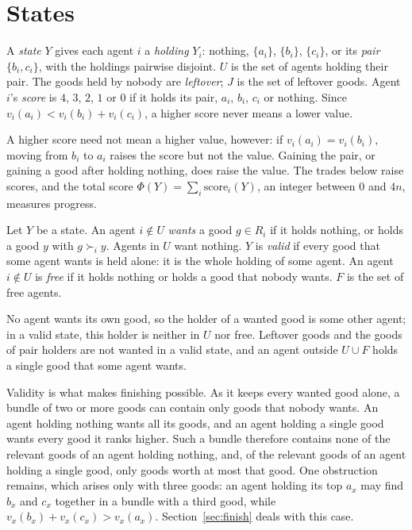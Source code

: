 \documentclass[runningheads,11pt]{llncs}
\begin{document}
\section{States}\label{sec:states}

\begin{definition}\label{def:state}
A \emph{state} $Y$ gives each agent $i$ a \emph{holding} $Y_i$: nothing, $\{a_i\}$, $\{b_i\}$, $\{c_i\}$, or its \emph{pair} $\{b_i,c_i\}$, with the holdings pairwise disjoint. $U$ is the set of agents holding their pair. The goods held by nobody are \emph{leftover}; $J$ is the set of leftover goods. Agent $i$'s \emph{score} is $4$, $3$, $2$, $1$ or $0$ if it holds its pair, $a_i$, $b_i$, $c_i$ or nothing. Since $v_i(a_i)<v_i(b_i)+v_i(c_i)$, a higher score never means a lower value.
\end{definition}

\noindent A higher score need not mean a higher value, however: if $v_i(a_i)=v_i(b_i)$, moving from $b_i$ to $a_i$ raises the score but not the value. Gaining the pair, or gaining a good after holding nothing, does raise the value. The trades below raise scores, and the total score $\Phi(Y)=\sum_i\mathrm{score}_i(Y)$, an integer between $0$ and $4n$, measures progress.

\begin{definition}\label{def:valid}
Let $Y$ be a state. An agent $i\notin U$ \emph{wants} a good $g\in R_i$ if it holds nothing, or holds a good $y$ with $g\succ_i y$. Agents in $U$ want nothing. $Y$ is \emph{valid} if every good that some agent wants is held alone: it is the whole holding of some agent. An agent $i\notin U$ is \emph{free} if it holds nothing or holds a good that nobody wants. $F$ is the set of free agents.
\end{definition}

\noindent No agent wants its own good, so the holder of a wanted good is some other agent; in a valid state, this holder is neither in $U$ nor free. Leftover goods and the goods of pair holders are not wanted in a valid state, and an agent outside $U\cup F$ holds a single good that some agent wants.

Validity is what makes finishing possible. As it keeps every wanted good alone, a bundle of two or more goods can contain only goods that nobody wants. An agent holding nothing wants all its goods, and an agent holding a single good wants every good it ranks higher. Such a bundle therefore contains none of the relevant goods of an agent holding nothing, and, of the relevant goods of an agent holding a single good, only goods worth at most that good. One obstruction remains, which arises only with three goods: an agent holding its top $a_x$ may find $b_x$ and $c_x$ together in a bundle with a third good, while $v_x(b_x)+v_x(c_x)>v_x(a_x)$. Section~\ref{sec:finish} deals with this case.
\end{document}
